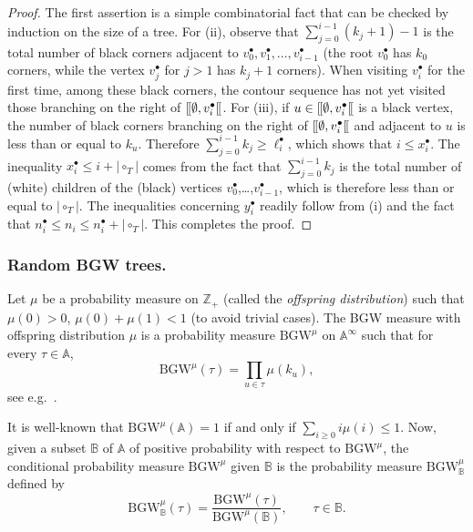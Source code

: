 \documentclass[AHL,XML,longabstracts,Unicode]{cedram}
\providecommand{\abs}[1]{\lvert#1\rvert}
\newcommand{\Z}{\mathbb{Z}}
\newcommand\BGW{\textrm{BGW}}
\def\llbracket{[\hspace{-.10em} [ }
\begin{document}
\begin{proof} The first assertion is a simple combinatorial fact that can be checked by induction on the size of a tree.
  For (ii),  observe that $\sum_{j=0}^{i-1}(k_{j}+1)-1$ is the total number of black corners adjacent to $v^{\bullet}_{0}, v^{\bullet}_{1}, \ldots, v^{\bullet}_{i-1}$ (the root $v^{\bullet}_0$ has $k_0$ corners, while the vertex $v^{\bullet}_j$ for $j>1$ has $k_j+1$ corners).
  When visiting $v^{\bullet}_{i}$ for the first time, among these black corners, the contour sequence has not yet visited those branching on the right of  $\llbracket \emptyset, v^{\bullet}_{i} \llbracket$. For (iii), if $u \in  \llbracket \emptyset, v^{\bullet}_{i} \llbracket$ is a black vertex,  the number of black corners  branching on the right of $\llbracket \emptyset, v^{\bullet}_{i} \llbracket$ and adjacent to $u$ is less than or equal to $k_{u}$. Therefore $\sum_{j=0}^{i-1} k_{j} \geq  \ell_{i}^{\bullet}$, which shows that $i \leq x^{\bullet}_{i}$. The inequality $x^{\bullet}_{i} \leq i+ \abs{\circ_{T}}$ comes from the fact that $\sum_{j=0}^{i-1} k_{j}$  is the total number of (white) children of the  (black) vertices $v^{\bullet}_0$,\dots,$v^{\bullet}_{i-1}$, which is therefore less than or equal to $ \abs{\circ_{T}}$. The inequalities concerning $y^{\bullet}_{i}$ readily follow from (i) and the fact that $ n^{\bullet}_{i} \leq n_{i} \leq n_{i}^{\bullet}+\abs{\circ_{T}}$. This completes the proof.
    \end{proof}


\subsubsection{Random BGW trees.} Let $\mu$ be a  probability measure on $\Z_+$ (called the \emph{offspring distribution}) such that $\mu(0) > 0$, $\mu(0)+\mu(1)<1$ (to avoid trivial cases). The {\BGW} measure with offspring distribution $\mu$ is a probability measure $\mathrm{BGW}^\mu$ on $\mathbb{A}^{\infty}$ such that  for every $\tau \in \mathbb{A}$,
\begin{equation}\label{eq:def_GW}
\mathrm{BGW}^\mu(\tau) = \prod_{u \in \tau} \mu(k_u),
\end{equation}
see e.g.~\cite[Prop.~1.4]{LG05}.

It is well-known that $\mathrm{BGW}^\mu(\mathbb{A})=1$ if and only if $\sum_{i \geq 0} i \mu (i) \leq 1$.
Now, given a subset $\mathbb{B}$ of $\mathbb A$ of positive probability with respect to  $\mathrm{BGW}^\mu$,
 the conditional probability measure  $\mathrm{BGW}^\mu$  given $\mathbb{B}$ is the probability measure $\mathrm{BGW}^\mu_{\mathbb B}$
defined by
\[ \mathrm{BGW}^\mu_{\mathbb B}(\tau)= \frac{\mathrm{BGW}^\mu( \tau)}{\mathrm{BGW}^\mu(\mathbb{B})},
\qquad \tau \in \mathbb{B}.\]
\end{document}
